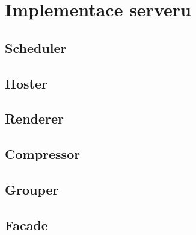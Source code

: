\section{Implementace serveru}

\subsection{Scheduler}
\subsection{Hoster}
\subsection{Renderer}
\subsection{Compressor}
\subsection{Grouper}
\subsection{Facade}